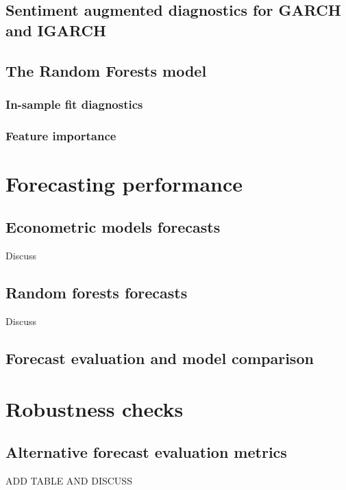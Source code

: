 \documentclass[12pt]{report}
\begin{document}
\subsection{Sentiment augmented diagnostics for GARCH and IGARCH}

\subsection{The Random Forests model}
\subsubsection{In-sample fit diagnostics}

\subsubsection{Feature importance}


\section{Forecasting performance}
%
\subsection{Econometric models forecasts}
Discuss
\subsection{Random forests forecasts}
Discuss
\subsection{Forecast evaluation and model comparison}



\section{Robustness checks}
\subsection{Alternative forecast evaluation metrics}
ADD TABLE AND DISCUSS
%
\end{document}
